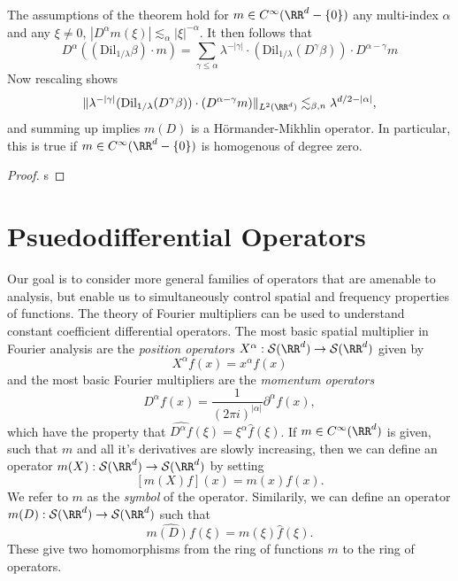 \begin{remark}
  The assumptions of the theorem hold for $m \in C^\infty(\RR^d - \{ 0 \})$ any multi-index $\alpha$ and any $\xi \neq 0$, $|D^\alpha m(\xi)| \lesssim_\alpha |\xi|^{-\alpha}$. It then follows that
  \[ D^\alpha((\text{Dil}_{1/\lambda} \beta) \cdot m) = \sum_{\gamma \leq \alpha} \lambda^{-|\gamma|} \cdot (\text{Dil}_{1/\lambda} (D^\gamma \beta)) \cdot D^{\alpha - \gamma} m \]
  Now rescaling shows
  \begin{align*}
    \| \lambda^{-|\gamma|} (\text{Dil}_{1/\lambda} (D^\gamma \beta)) \cdot (D^{\alpha - \gamma} m) \|_{L^2(\RR^d)} \lesssim_{\beta,n} \lambda^{d/2-|\alpha|},
  \end{align*}
  and summing up implies $m(D)$ is a H\"{o}rmander-Mikhlin operator. In particular, this is true if $m \in C^\infty(\RR^d - \{ 0 \})$ is homogenous of degree zero.
\end{remark}

\begin{proof}
  s
\end{proof}







\chapter{Psuedodifferential Operators}

Our goal is to consider more general families of operators that are amenable to analysis, but enable us to simultaneously control spatial and frequency properties of functions. The theory of Fourier multipliers can be used to understand constant coefficient differential operators. The most basic spatial multiplier in Fourier analysis are the \emph{position operators} $X^\alpha: \mathcal{S}(\RR^d) \to \mathcal{S}(\RR^d)$ given by
%
\[ X^\alpha f(x) = x^\alpha f(x) \]
%
and the most basic Fourier multipliers are the \emph{momentum operators}
%
\[ D^\alpha f(x) = \frac{1}{(2\pi i)^{|\alpha|}} \partial^\alpha f(x), \]
%
which have the property that $\widehat{D^\alpha f}(\xi) = \xi^\alpha \widehat{f}(\xi)$. If $m \in C^\infty(\RR^d)$ is given, such that $m$ and all it's derivatives are slowly increasing, then we can define an operator $m(X): \mathcal{S}(\RR^d) \to \mathcal{S}(\RR^d)$ by setting
%
\[ [m(X) f](x) = m(x) f(x). \]
%
We refer to $m$ as the \emph{symbol} of the operator. Similarily, we can define an operator $m(D): \mathcal{S}(\RR^d) \to \mathcal{S}(\RR^d)$ such that
%
\[ \widehat{m(D) f}(\xi) = m(\xi) \widehat{f}(\xi). \]
%
These give two homomorphisms from the ring of functions $m$ to the ring of operators.

